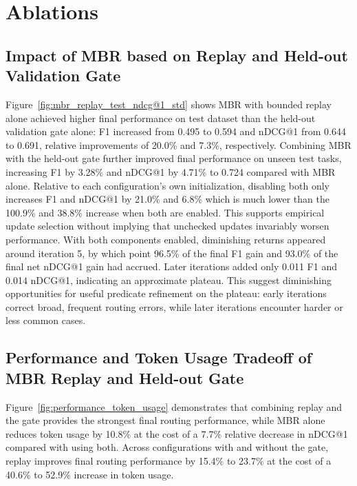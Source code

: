 

\section{Ablations}

\begingroup
\let\ablationfigure\figure
\renewcommand{\figure}[1][]{\ablationfigure[!t]}

\endgroup

\subsection{Impact of MBR based on Replay and Held-out Validation Gate}

Figure~\ref{fig:mbr_replay_test_ndcg@1_std} shows MBR with bounded replay alone achieved higher final performance on test dataset than the held-out validation gate alone: F1 increased from 0.495 to 0.594 and nDCG@1 from 0.644 to 0.691, relative improvements of 20.0\% and 7.3\%, respectively. Combining MBR with the held-out gate further improved final performance on unseen test tasks, increasing F1 by 3.28\% and nDCG@1 by 4.71\% to 0.724 compared with MBR alone. Relative to each configuration's own initialization, disabling both only increases F1 and nDCG@1 by 21.0\% and 6.8\% which is much lower than the 100.9\% and 38.8\% increase when both are enabled. This supports empirical update selection without implying that unchecked updates invariably worsen performance. With both components enabled, diminishing returns appeared around iteration 5, by which point 96.5\% of the final F1 gain and 93.0\% of the final net nDCG@1 gain had accrued. Later iterations added only 0.011 F1 and 0.014 nDCG@1, indicating an approximate plateau. This suggest diminishing opportunities for useful predicate refinement on the plateau: early iterations correct broad, frequent routing errors, while later iterations encounter harder or less common cases.

\subsection{Performance and Token Usage Tradeoff of MBR Replay and Held-out Gate}

Figure~\ref{fig:performance_token_usage} demonstrates that combining replay and the gate provides the strongest final routing performance, while MBR alone reduces token usage by 10.8\% at the cost of a 7.7\% relative decrease in nDCG@1 compared with using both. Across configurations with and without the gate, replay improves final routing performance by 15.4\% to 23.7\% at the cost of a  40.6\% to 52.9\% increase in token usage.

